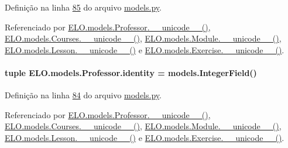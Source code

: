 Definição na linha \hyperlink{ELO_2models_8py_source_l00085}{85} do arquivo \hyperlink{ELO_2models_8py_source}{models.\-py}.



Referenciado por \hyperlink{classELO_1_1models_1_1Professor_aefc9d63d429e19ec3487a7879879f29d}{E\-L\-O.\-models.\-Professor.\-\_\-\-\_\-unicode\-\_\-\-\_\-()}, \hyperlink{classELO_1_1models_1_1Courses_a8926a37152be8d4fc3e0ba6af200f871}{E\-L\-O.\-models.\-Courses.\-\_\-\-\_\-unicode\-\_\-\-\_\-()}, \hyperlink{classELO_1_1models_1_1Module_a1b54aa7a5e8dac090dea0926eca5550d}{E\-L\-O.\-models.\-Module.\-\_\-\-\_\-unicode\-\_\-\-\_\-()}, \hyperlink{classELO_1_1models_1_1Lesson_a3d9f0295dbe1ed5c74668d6c0876f97c}{E\-L\-O.\-models.\-Lesson.\-\_\-\-\_\-unicode\-\_\-\-\_\-()} e \hyperlink{classELO_1_1models_1_1Exercise_af3e991e5610cec815a2c3260ec6aae0b}{E\-L\-O.\-models.\-Exercise.\-\_\-\-\_\-unicode\-\_\-\-\_\-()}.

\hypertarget{classELO_1_1models_1_1Professor_a314012619a14c0319c86ba52b6beeb2f}{
\paragraph[{identity}]{\setlength{\rightskip}{0pt plus 5cm}tuple E\-L\-O.\-models.\-Professor.\-identity = models.\-Integer\-Field()\hspace{0.3cm}{\ttfamily [static]}}}\label{classELO_1_1models_1_1Professor_a314012619a14c0319c86ba52b6beeb2f}


Definição na linha \hyperlink{ELO_2models_8py_source_l00084}{84} do arquivo \hyperlink{ELO_2models_8py_source}{models.\-py}.



Referenciado por \hyperlink{classELO_1_1models_1_1Professor_aefc9d63d429e19ec3487a7879879f29d}{E\-L\-O.\-models.\-Professor.\-\_\-\-\_\-unicode\-\_\-\-\_\-()}, \hyperlink{classELO_1_1models_1_1Courses_a8926a37152be8d4fc3e0ba6af200f871}{E\-L\-O.\-models.\-Courses.\-\_\-\-\_\-unicode\-\_\-\-\_\-()}, \hyperlink{classELO_1_1models_1_1Module_a1b54aa7a5e8dac090dea0926eca5550d}{E\-L\-O.\-models.\-Module.\-\_\-\-\_\-unicode\-\_\-\-\_\-()}, \hyperlink{classELO_1_1models_1_1Lesson_a3d9f0295dbe1ed5c74668d6c0876f97c}{E\-L\-O.\-models.\-Lesson.\-\_\-\-\_\-unicode\-\_\-\-\_\-()} e \hyperlink{classELO_1_1models_1_1Exercise_af3e991e5610cec815a2c3260ec6aae0b}{E\-L\-O.\-models.\-Exercise.\-\_\-\-\_\-unicode\-\_\-\-\_\-()}.

